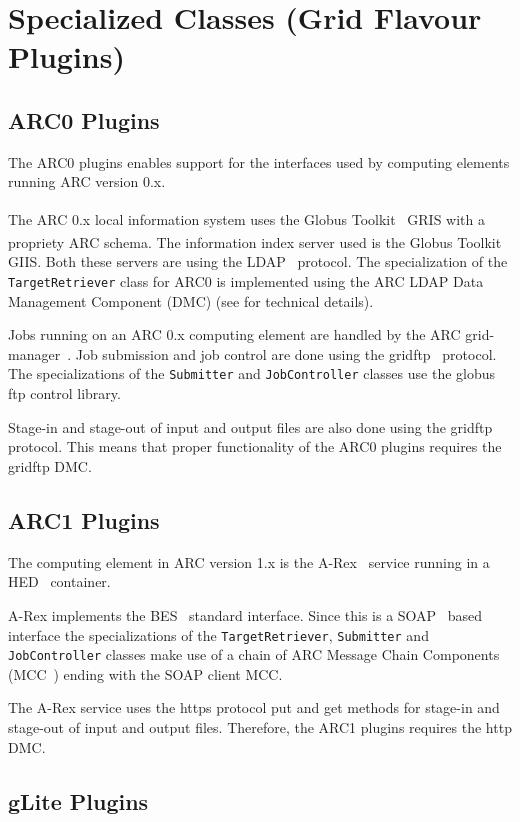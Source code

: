 \documentclass{book}
\newcommand{\GT}{Globus Toolkit\textsuperscript{\textregistered}}
\newcommand{\JobController}{\texttt{JobController}}
\newcommand{\TargetRetriever}{\texttt{TargetRetriever}}
\newcommand{\Submitter}{\texttt{Submitter}}
\begin{document}
\section{Specialized Classes (Grid Flavour Plugins)}
\label{sec:plugins}

\subsection{ARC0 Plugins}

The ARC0 plugins enables support for the interfaces used by computing
elements running ARC version 0.x.

The ARC 0.x local information system uses the {\GT}~\cite{globus} GRIS
with a propriety ARC schema. The information index server used is the
{\GT} GIIS. Both these servers are using the LDAP~\cite{ldap}
protocol. The specialization of the {\TargetRetriever} class for ARC0
is implemented using the ARC LDAP Data Management Component (DMC) (see
\cite{hed} for technical details).

Jobs running on an ARC 0.x computing element are handled by the ARC
grid-manager~\cite{gm}. Job submission and job control are done using
the gridftp~\cite{gridftp} protocol. The specializations of the
{\Submitter} and {\JobController} classes use the globus ftp control
library.

Stage-in and stage-out of input and output files are also done using
the gridftp~\cite{gridftp} protocol. This means that proper
functionality of the ARC0 plugins requires the gridftp DMC.

\subsection{ARC1 Plugins}

The computing element in ARC version 1.x is the A-Rex~\cite{arex}
service running in a HED~\cite{hed} container.

A-Rex implements the BES~\cite{ogsa-bes} standard interface. Since
this is a SOAP~\cite{soap} based interface the specializations of the
{\TargetRetriever}, {\Submitter} and {\JobController} classes make use
of a chain of ARC Message Chain Components (MCC~\cite{hed}) ending
with the SOAP client MCC.

The A-Rex service uses the https protocol put and get methods for
stage-in and stage-out of input and output files. Therefore, the ARC1
plugins requires the http DMC.

\subsection{gLite Plugins}
\end{document}

